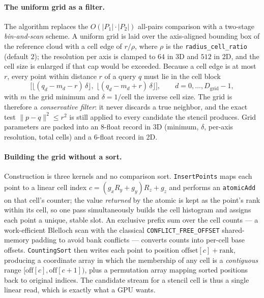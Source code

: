 \documentclass[11pt]{article}
\begin{document}
\paragraph{The uniform grid as a filter.}
The algorithm replaces the $O(|P_1| \cdot |P_2|)$ all-pairs comparison with a
two-stage \emph{bin-and-scan} scheme. A uniform grid is laid over the axis-aligned
bounding box of the reference cloud with a cell edge of $r/\rho$, where $\rho$
is the \texttt{radius\_cell\_ratio} (default $2$); the resolution per axis is
clamped to $64$ in 3D and $512$ in 2D, and the cell size is enlarged if that cap
would be exceeded. Because a cell edge is at most $r$, every point within
distance $r$ of a query $q$ must lie in the cell block
\[
  \Big[\big\lfloor (q_d - m_d - r)\,\delta \big\rfloor,\;
       \big\lfloor (q_d - m_d + r)\,\delta \big\rfloor \Big],
  \qquad d = 0,\dots,D_{\text{grid}}-1,
\]
with $m$ the grid minimum and $\delta = 1/\text{cell}$ the inverse cell size.
The grid is therefore a \emph{conservative filter}: it never discards a true
neighbor, and the exact test $\lVert p - q \rVert^2 \le r^2$ is still applied to
every candidate the stencil produces. Grid parameters are packed into an
$8$-float record in 3D (minimum, $\delta$, per-axis resolution, total cells) and
a $6$-float record in 2D.

\paragraph{Building the grid without a sort.}
Construction is three kernels and no comparison sort. \texttt{InsertPoints}
maps each point to a linear cell index
$c = (g_x R_y + g_y) R_z + g_z$ and performs an \texttt{atomicAdd} on that
cell's counter; the value \emph{returned} by the atomic is kept as the point's
rank within its cell, so one pass simultaneously builds the cell histogram and
assigns each point a unique, stable slot. An exclusive prefix sum over the cell
counts --- a work-efficient Blelloch scan with the classical
\texttt{CONFLICT\_FREE\_OFFSET} shared-memory padding to avoid bank conflicts
--- converts counts into per-cell base offsets. \texttt{CountingSort} then
writes each point to position $\text{offset}[c] + \text{rank}$, producing a
coordinate array in which the membership of any cell is a \emph{contiguous}
range $[\text{off}[c], \text{off}[c{+}1])$, plus a permutation array mapping
sorted positions back to original indices. The candidate stream for a stencil
cell is thus a single linear read, which is exactly what a GPU wants.
\end{document}
